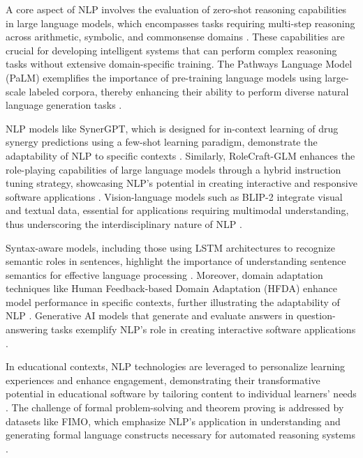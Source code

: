 A core aspect of NLP involves the evaluation of zero-shot reasoning capabilities in large language models, which encompasses tasks requiring multi-step reasoning across arithmetic, symbolic, and commonsense domains \cite{kojima2022large}. These capabilities are crucial for developing intelligent systems that can perform complex reasoning tasks without extensive domain-specific training. The Pathways Language Model (PaLM) exemplifies the importance of pre-training language models using large-scale labeled corpora, thereby enhancing their ability to perform diverse natural language generation tasks \cite{chowdhery2023palm}.



NLP models like SynerGPT, which is designed for in-context learning of drug synergy predictions using a few-shot learning paradigm, demonstrate the adaptability of NLP to specific contexts \cite{edwards2023synergptincontextlearningpersonalized}. Similarly, RoleCraft-GLM enhances the role-playing capabilities of large language models through a hybrid instruction tuning strategy, showcasing NLP's potential in creating interactive and responsive software applications \cite{tao2024rolecraftglmadvancingpersonalizedroleplaying}. Vision-language models such as BLIP-2 integrate visual and textual data, essential for applications requiring multimodal understanding, thus underscoring the interdisciplinary nature of NLP \cite{li2023blip}.



Syntax-aware models, including those using LSTM architectures to recognize semantic roles in sentences, highlight the importance of understanding sentence semantics for effective language processing \cite{qian2017syntaxawarelstmmodel}. Moreover, domain adaptation techniques like Human Feedback-based Domain Adaptation (HFDA) enhance model performance in specific contexts, further illustrating the adaptability of NLP \cite{park2023domainadaptationbasedhuman}. Generative AI models that generate and evaluate answers in question-answering tasks exemplify NLP's role in creating interactive software applications \cite{oh2024generativeaiparadoxevaluation}.



In educational contexts, NLP technologies are leveraged to personalize learning experiences and enhance engagement, demonstrating their transformative potential in educational software by tailoring content to individual learners' needs \cite{kasneci2023chatgpt}. The challenge of formal problem-solving and theorem proving is addressed by datasets like FIMO, which emphasize NLP's application in understanding and generating formal language constructs necessary for automated reasoning systems \cite{liu2023fimochallengeformaldataset}.



